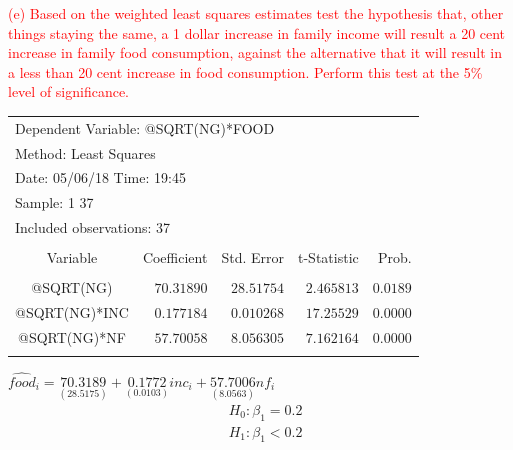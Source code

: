 \documentclass[12pt]{report}
\begin{document}
\noindent \textcolor{red}
{
	(e) Based on the weighted least squares estimates test the hypothesis that, other things staying the same, a 1 dollar increase in family income will result a 20 cent increase in family food consumption, against the alternative that it will result in a less than 20 cent increase in food consumption. Perform this test at the 5\% level of significance.
}
\begin{table}[H]
	\centering
	\begin{tabular}{lrrrr}
		\multicolumn{4}{l}{Dependent Variable: @SQRT(NG)*FOOD}&\multicolumn{1}{c}{}\\
		\multicolumn{3}{l}{Method: Least Squares}&\multicolumn{1}{c}{}&\multicolumn{1}{c}{}\\
		\multicolumn{3}{l}{Date: 05/06/18   Time: 19:45}&\multicolumn{1}{c}{}&\multicolumn{1}{c}{}\\
		\multicolumn{2}{l}{Sample: 1 37}&\multicolumn{1}{c}{}&\multicolumn{1}{c}{}&\multicolumn{1}{c}{}\\
		\multicolumn{3}{l}{Included observations: 37}&\multicolumn{1}{c}{}&\multicolumn{1}{c}{}\\
		[4.5pt] \hline \\ [-4.5pt]
		\multicolumn{1}{c}{Variable}&\multicolumn{1}{r}{Coefficient}&\multicolumn{1}{r}{Std. Error}&\multicolumn{1}{r}{t-Statistic}&\multicolumn{1}{r}{Prob.}\\
		[4.5pt] \hline \\ [-4.5pt]
		\multicolumn{1}{c}{@SQRT(NG)}&\multicolumn{1}{r}{$70.31890$}&\multicolumn{1}{r}{$28.51754$}&\multicolumn{1}{r}{$2.465813$}&\multicolumn{1}{r}{$0.0189$}\\
		\multicolumn{1}{c}{@SQRT(NG)*INC}&\multicolumn{1}{r}{$0.177184$}&\multicolumn{1}{r}{$0.010268$}&\multicolumn{1}{r}{$17.25529$}&\multicolumn{1}{r}{$0.0000$}\\
		\multicolumn{1}{c}{@SQRT(NG)*NF}&\multicolumn{1}{r}{$57.70058$}&\multicolumn{1}{r}{$8.056305$}&\multicolumn{1}{r}{$7.162164$}&\multicolumn{1}{r}{$0.0000$}\\
		[4.5pt] \hline \\ [-4.5pt]
	\end{tabular}
\end{table}
\centering $\widehat{food}_i = \underset{(28.5175)}{70.3189} + \underset{(0.0103)}{0.1772}inc_i + \underset{(8.0563)}{57.7006}nf_i$
\begin{align*}
	&H_0: \beta_1 = 0.2 \\
	&H_1: \beta_1 < 0.2
\end{align*}
\end{document}
